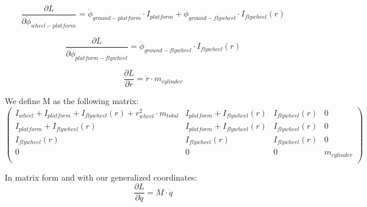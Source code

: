 \begin{equation}
	\frac{\partial L}{\partial \dot{\phi}_{wheel-platform}}=
	\dot{\phi}_{ground-platform} \cdot I_{platform}
	+ \dot{\phi}_{ground-flywheel}\cdot I_{flywheel}(r)
\end{equation}

\begin{equation}
	\frac{\partial L}{\partial \dot{\phi}_{platform-flywheel}}=
	\dot{\phi}_{ground-flywheel}\cdot I_{flywheel}(r)
\end{equation}

\begin{equation}
	\frac{\partial L}{\partial \dot{r}}=
	\dot{r}\cdot m_{cylinder}
\end{equation}

We define M as the following matrix:
\begin{equation}
	\begin{pmatrix}
		I_{wheel} + I_{platform} + I_{flywheel}(r) + r_{wheel}^2 \cdot m_{total} &
		I_{platform} + I_{flywheel}(r)                                           &
		I_{flywheel}(r)                                                          &
		0                                                                          \\
		I_{platform} + I_{flywheel}(r)                                           &
		I_{platform} + I_{flywheel}(r)                                           &
		I_{flywheel}(r)                                                          &
		0                                                                          \\
		I_{flywheel}(r)                                                          &
		I_{flywheel}(r)                                                          &
		I_{flywheel}(r)                                                          &
		0                                                                          \\
		0                                                                        &
		0                                                                        &
		0                                                                        &
		m_{cylinder}                                                               \\
	\end{pmatrix}
\end{equation}

In matrix form and with our generalized coordinates:
\begin{equation}
	\frac{\partial L}{\partial \dot{q}} =
	M \cdot \dot{q}
\end{equation}

